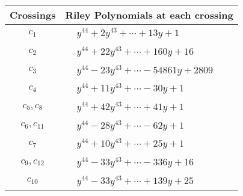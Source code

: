 \documentclass[1p]{elsarticle_modified}
\theoremstyle{definition}
\begin{document}
\begin{tabular}{m{50pt}|m{274pt}}
Crossings & \hspace{64pt}Riley Polynomials at each crossing \\
\hline $$\begin{aligned}c_{1}\end{aligned}$$&$\begin{aligned}
&y^{44}+2 y^{43}+\cdots+13 y+1
\end{aligned}$\\
\hline $$\begin{aligned}c_{2}\end{aligned}$$&$\begin{aligned}
&y^{44}+22 y^{43}+\cdots+160 y+16
\end{aligned}$\\
\hline $$\begin{aligned}c_{3}\end{aligned}$$&$\begin{aligned}
&y^{44}-23 y^{43}+\cdots-54861 y+2809
\end{aligned}$\\
\hline $$\begin{aligned}c_{4}\end{aligned}$$&$\begin{aligned}
&y^{44}+11 y^{43}+\cdots-30 y+1
\end{aligned}$\\
\hline $$\begin{aligned}c_{5},c_{8}\end{aligned}$$&$\begin{aligned}
&y^{44}+42 y^{43}+\cdots+41 y+1
\end{aligned}$\\
\hline $$\begin{aligned}c_{6},c_{11}\end{aligned}$$&$\begin{aligned}
&y^{44}-28 y^{43}+\cdots-62 y+1
\end{aligned}$\\
\hline $$\begin{aligned}c_{7}\end{aligned}$$&$\begin{aligned}
&y^{44}+10 y^{43}+\cdots+25 y+1
\end{aligned}$\\
\hline $$\begin{aligned}c_{9},c_{12}\end{aligned}$$&$\begin{aligned}
&y^{44}-33 y^{43}+\cdots-336 y+16
\end{aligned}$\\
\hline $$\begin{aligned}c_{10}\end{aligned}$$&$\begin{aligned}
&y^{44}-33 y^{43}+\cdots+139 y+25
\end{aligned}$\\
\hline
\end{tabular}\\~\\
\end{document}

